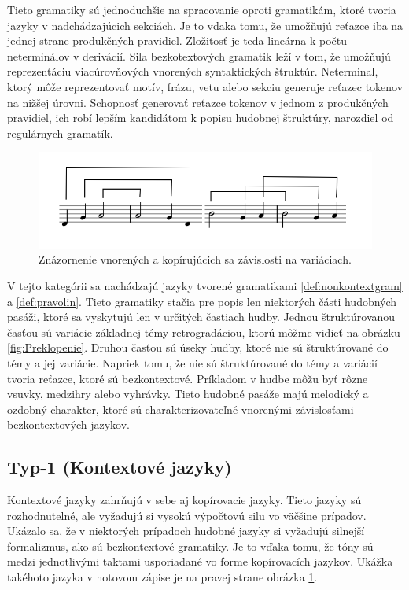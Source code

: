 Tieto gramatiky sú jednoduchšie na spracovanie oproti gramatikám, ktoré tvoria jazyky v nadchádzajúcich sekciách. Je to vďaka tomu, že umožňujú reťazce iba na jednej strane produkčných pravidiel. Zložitosť je teda lineárna k počtu neterminálov v derivácií. Sila bezkotextových gramatik leží v tom, že umožňujú reprezentáciu viacúrovňových vnorených syntaktických štruktúr. Neterminal, ktorý môže reprezentovať motív, frázu, vetu alebo sekciu generuje reťazec tokenov na nižšej úrovni. Schopnosť generovať reťazce tokenov v jednom z produkčných pravidiel, ich robí lepším kandidátom k popisu hudobnej štruktúry, narozdiel od regulárnych gramatík.

\begin{figure}[H]
    \centering
    \includegraphics[scale=0.4]{obrazky-figures/zavislosti.png}
    \caption{Znázornenie vnorených a kopírujúcich sa závislosti na variáciach.}
    \label{fig:dependencies}
\end{figure}

V tejto kategórii sa nachádzajú jazyky tvorené gramatikami \ref{def:nonkontextgram} a \ref{def:pravolin}. Tieto gramatiky stačia pre popis len niektorých části hudobných pasáži, ktoré sa vyskytujú len v určitých častiach hudby. Jednou štruktúrovanou časťou sú variácie základnej témy retrogradáciou, ktorú môžme vidieť na obrázku \ref{fig:Preklopenie}. Druhou časťou sú úseky hudby, ktoré nie sú štruktúrované do témy a jej variácie. Napriek tomu, že nie sú štruktúrované do témy a variácií tvoria reťazce, ktoré sú bezkontextové. Príkladom v hudbe môžu byť rôzne vsuvky, medzihry alebo vyhrávky. Tieto hudobné pasáže majú melodický a ozdobný charakter, ktoré sú charakterizovateľné vnorenými závislosťami bezkontextových jazykov.

\subsection*{Typ-1 (Kontextové jazyky)}
Kontextové jazyky zahrňujú v sebe aj kopírovacie jazyky. Tieto jazyky sú rozhodnutelné, ale vyžadujú si vysokú výpočtovú silu vo väčšine prípadov. Ukázalo sa, že v niektorých prípadoch hudobné jazyky si vyžadujú silnejší formalizmus, ako sú bezkontextové gramatiky. Je to vďaka tomu, že tóny sú medzi jednotlivými taktami usporiadané vo forme kopírovacích jazykov. Ukážka takéhoto jazyka v notovom zápise je na pravej strane obrázka \ref{fig:dependencies}.

